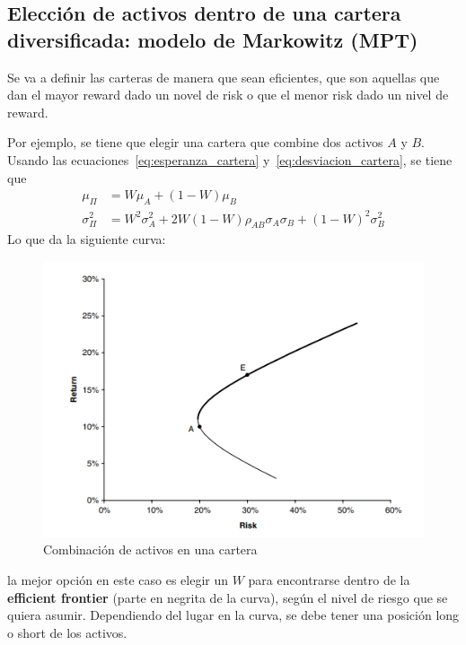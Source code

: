 \subsection{Elección de activos dentro de una cartera diversificada: modelo de Markowitz (MPT)}
Se va a definir las carteras de manera que sean eficientes, que son aquellas que dan el mayor reward dado un novel de risk o que el menor risk dado un nivel de reward. 

Por ejemplo, se tiene que elegir una cartera que combine dos activos $A$ y $B$. Usando las ecuaciones~\eqref{eq:esperanza_cartera} y~\eqref{eq:desviacion_cartera}, se tiene que
\begin{align*}
    \mu_\Pi &= W \mu_A + (1 - W) \mu_B \\
    \sigma^2_\Pi &= W^2 \sigma_A^2 + 2W(1-W)\rho_{AB}\sigma_A\sigma_B + (1-W)^2 \sigma_B^2
\end{align*}
Lo que da la siguiente curva:
\begin{figure}[H]
    \centering
    \includegraphics[width=0.65\linewidth]{Imagenes/Parte1/14_Gestion_carteras/Combinacion_activos.png}
    \caption{Combinación de activos en una cartera}
\end{figure}
la mejor opción en este caso es elegir un $W$ para encontrarse dentro de la \textbf{efficient frontier} (parte en negrita de la curva), según el nivel de riesgo que se quiera asumir. Dependiendo del lugar en la curva, se debe tener una posición long o short de los activos.


